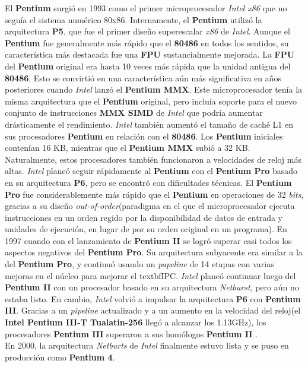 El \textbf{Pentium} surgió en 1993 como el primer microprocesador \emph{Intel x86} que no seguía el sistema numérico 80x86. Internamente, el \textbf{Pentium} utilizó 
la arquitectura \textbf{P5}, que fue el primer diseño superescalar \emph{x86} de \emph{Intel}. Aunque el \textbf{Pentium} fue generalmente más rápido que 
el \textbf{80486} en todos los sentidos, su característica más destacada fue una \textbf{FPU} sustancialmente mejorada. La \textbf{FPU} del \textbf{Pentium} original 
era hasta 10 veces más rápida que la unidad antigua del \textbf{80486}. Esto se convirtió en una característica aún más significativa en años posteriores cuando \emph{Intel} 
lanzó el \textbf{Pentium MMX}. Este microprocesador tenía la misma arquitectura que el \textbf{Pentium} original, pero incluía soporte para el nuevo conjunto de instrucciones 
\textbf{MMX SIMD} de \emph{Intel} que podría aumentar drásticamente el rendimiento. \emph{Intel} también aumentó el tamaño de caché L1 en sus procesadores \textbf{Pentium} en relación con el \textbf{80486}. 
Los \textbf{Pentium} iniciales contenían 16 KB, mientras que el \textbf{Pentium MMX} subió a 32 KB. Naturalmente, estos procesadores también funcionaron a velocidades de reloj más altas. 
\emph{Intel} planeó seguir rápidamente al \textbf{Pentium} con el \textbf{Pentium Pro} basado en su arquitectura \textbf{P6}, pero se encontró con dificultades técnicas. El \textbf{Pentium Pro} 
fue considerablemente más rápido que el \textbf{Pentium} en operaciones de 32 \emph{bits}, gracias a su diseño \emph{out-of-order}(paradigma en el que el microprocesador ejecuta 
instrucciones en un orden regido por la disponibilidad de datos de entrada y unidades de ejecución, en lugar de por su orden original en un programa). En 1997 cuando con el lanzamiento de 
\textbf{Pentium II} se logró superar casi todos los aspectos negativos del \textbf{Pentium Pro}. Su arquitectura subyacente era similar a la del \textbf{Pentium Pro}, 
y continuó usando un \emph{papeline} de 14 etapas con varias mejoras en el núcleo para mejorar el textbf{IPC}. \emph{Intel} planeó continuar luego  del \textbf{Pentium II} con un procesador basado en su arquitectura \emph{Netburst}, 
pero aún no estaba listo. En cambio, \emph{Intel} volvió a impulsar la arquitectura \textbf{P6} con \textbf{Pentium III}. Gracias a un \emph{pipeline} actualizado y a un 
aumento en la velocidad del reloj(el \textbf{Intel Pentium III-T Tualatin-256} llegó a alcanzar los 1.13GHz), los procesadores \textbf{Pentium III} superaron a sus 
homólogos \textbf{Pentium II} .\\ En 2000, la arquitectura \emph{Netburts} de \emph{Intel} finalmente estuvo lista y se puso en producción como \textbf{Pentium 4}. 
